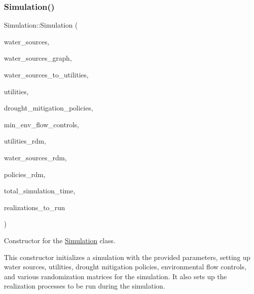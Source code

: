 \subsubsection{\texorpdfstring{Simulation()}{Simulation()}\hspace{0.1cm}{\footnotesize\ttfamily [1/3]}}
{\footnotesize\ttfamily Simulation\+::\+Simulation (\begin{DoxyParamCaption}\item[{vector$<$ \mbox{\hyperlink{classWaterSource}{Water\+Source}} $\ast$$>$ \&}]{water\+\_\+sources,  }\item[{Graph \&}]{water\+\_\+sources\+\_\+graph,  }\item[{const vector$<$ vector$<$ int $>$$>$ \&}]{water\+\_\+sources\+\_\+to\+\_\+utilities,  }\item[{vector$<$ \mbox{\hyperlink{classUtility}{Utility}} $\ast$$>$ \&}]{utilities,  }\item[{const vector$<$ Drought\+Mitigation\+Policy $\ast$$>$ \&}]{drought\+\_\+mitigation\+\_\+policies,  }\item[{vector$<$ Min\+Env\+Flow\+Control $\ast$$>$ \&}]{min\+\_\+env\+\_\+flow\+\_\+controls,  }\item[{vector$<$ vector$<$ double $>$$>$ \&}]{utilities\+\_\+rdm,  }\item[{vector$<$ vector$<$ double $>$$>$ \&}]{water\+\_\+sources\+\_\+rdm,  }\item[{vector$<$ vector$<$ double $>$$>$ \&}]{policies\+\_\+rdm,  }\item[{const unsigned long}]{total\+\_\+simulation\+\_\+time,  }\item[{vector$<$ unsigned long $>$ \&}]{realizations\+\_\+to\+\_\+run }\end{DoxyParamCaption})}



Constructor for the \mbox{\hyperlink{classSimulation}{Simulation}} class. 

This constructor initializes a simulation with the provided parameters, setting up water sources, utilities, drought mitigation policies, environmental flow controls, and various randomization matrices for the simulation. It also sets up the realization processes to be run during the simulation.


